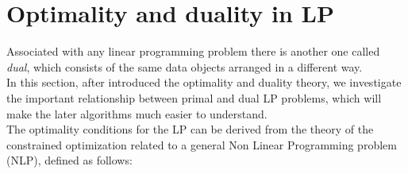 \documentclass[a4paper,10 pt,titlepage,twoside]{report}
\theoremstyle{plain}
\theoremstyle{definition}
\newtheorem{ex}[thm]{Example}
\theoremstyle{remark}
\begin{document}

\section{Optimality and duality in LP}
Associated with any linear programming problem there is another one called \textit{dual}, which consists of the same data objects arranged in a different way.\\In this section, after introduced the optimality and duality theory, we investigate the important relationship between primal and dual LP problems, which will make the later algorithms
much easier to understand.\\ 
The optimality conditions for the LP can be derived from the theory of the constrained optimization related to a general Non Linear Programming problem (NLP), defined as follows:
\end{document}
